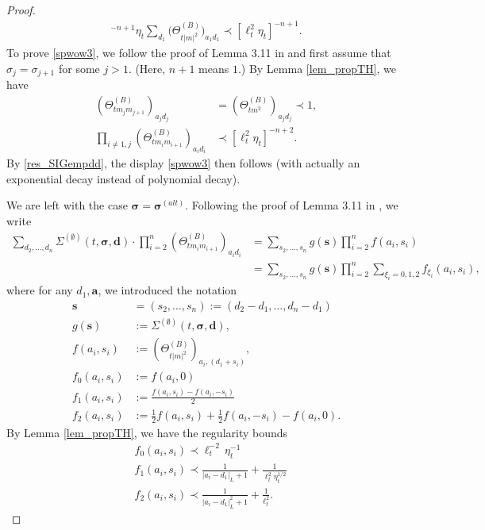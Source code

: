 \begin{proof}
\begin{align*}
[\ell_{t}^{2}\eta_{t}]^{-n+1}\eta_{t}\sum_{d_{1}}\Big(\Theta^{(B)}_{t|m|^{2}}\Big)_{a_{1}d_{1}}\prec [\ell_{t}^{2}\eta_{t}]^{-n+1}.
\end{align*}
%
To prove \eqref{spwow3}, we follow the proof of Lemma 3.11 in \cite{YY_25} and first assume that $\sigma_{j}=\sigma_{j+1}$ for some $j>1$. (Here, $n+1$ means $1$.) By Lemma \ref{lem_propTH}, we have 
%
\begin{align*}
    (\Theta^{(B)}_{tm_{j}m_{j+1}})_{a_{j}d_{j}}&=(\Theta^{(B)}_{tm^{2}})_{a_{j}d_{j}}\prec1,\\
    \prod_{i\neq1,j}(\Theta^{(B)}_{tm_{i}m_{i+1}})_{a_{i}d_{i}}&\prec[\ell_{t}^{2}\eta_{t}]^{-n+2}.
\end{align*}
By \eqref{res_SIGempdd}, the display \eqref{spwow3} then follows (with actually an exponential decay instead of polynomial decay).

We are left with the case $\boldsymbol{\sigma}=\boldsymbol{\sigma}^{(alt)}$. Following the proof of Lemma 3.11 in \cite{YY_25}, we write
%
\begin{align}
\sum_{d_{2},\ldots,d_{n}}\Sigma^{(\emptyset)}(t,\boldsymbol{\sigma},\textbf{d})\cdot\prod_{i=2}^{n}\left(\Theta^{(B)}_{tm_{i}m_{i+1}}\right)_{a_{i}d_{i}}&=\sum_{s_{2},\ldots,s_{n}}g(\textbf{s})\prod_{i=2}^{n}f(a_{i},s_{i})\\
&=\sum_{s_{2},\ldots,s_{n}}g(\textbf{s})\prod_{i=2}^{n}\sum_{\xi_{i}=0,1,2}f_{\xi_{i}}(a_{i},s_{i}),
\end{align}
%
where for any $d_{1},\textbf{a}$, we introduced the notation
%
\begin{align*}
\textbf{s}&=(s_{2},\ldots,s_{n}):=(d_{2}-d_{1},\ldots,d_{n}-d_{1})\\
g(\textbf{s})&:=\Sigma^{(\emptyset)}(t,\boldsymbol{\sigma},\textbf{d}),\\
f(a_{i},s_{i})&:=\left(\Theta^{(B)}_{t|m|^{2}}\right)_{a_{i},(d_{1}+s_{i})},\\
f_{0}(a_{i},s_{i})&:=f(a_{i},0)\\
f_{1}(a_{i},s_{i})&:=\frac{f(a_{i},s_{i})-f(a_{i},-s_{i})}{2}\\
f_{2}(a_{i},s_{i})&:=\frac12 f(a_{i},s_{i})+\frac12 f(a_{i},-s_{i})-f(a_{i},0).
\end{align*}
%
By Lemma \ref{lem_propTH}, we have the regularity bounds
$$\begin{aligned} & f_0\left(a_i, s_i\right)\prec \ell^{-2}_t \,\eta_t^{-1} \\ & f_1\left(a_i, s_i\right) \prec \frac{1}{\left|a_i-d_1\right|_{L}+1}+\frac{1}{\ell_{t}^{2}\eta_{t}^{1/2}} \\ & f_2\left(a_i, s_i\right)\prec \frac{1}{\left|a_i-d_1\right|_{L}^{2}+1}+\frac{1}{\ell_{t}^{2}}.\end{aligned}$$


\end{proof}

